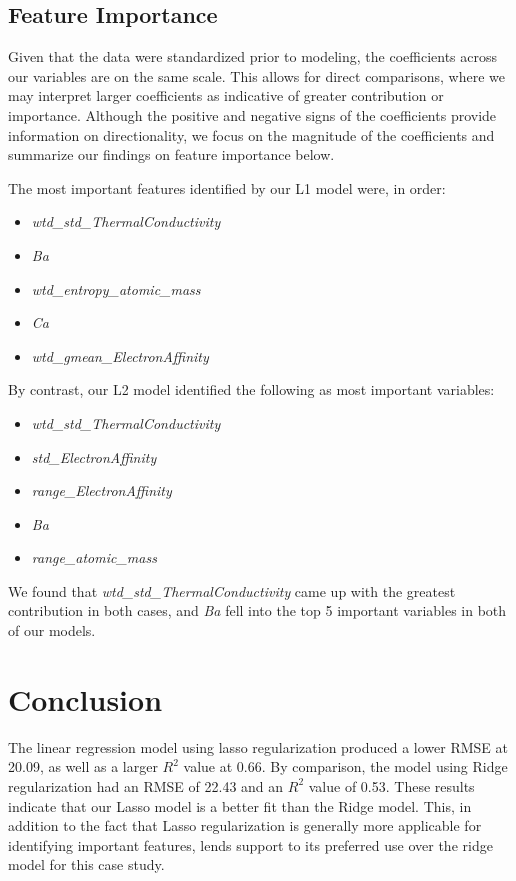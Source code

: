 \documentclass[twoside,twocolumn]{article}
\begin{document}
\subsection{Feature Importance}
Given that the data were standardized prior to modeling, the coefficients across our variables are on the same scale. This allows for direct comparisons, where we may interpret larger coefficients as indicative of greater contribution or importance. Although the positive and negative signs of the coefficients provide information on directionality, we focus on the magnitude of the coefficients and summarize our findings on feature importance below. 

The most important features identified by our L1 model were, in order:
\begin{itemize}
    \item \emph{wtd\_std\_ThermalConductivity}
    \item \emph{Ba}
    \item \emph{wtd\_entropy\_atomic\_mass}
    \item \emph{Ca}
    \item \emph{wtd\_gmean\_ElectronAffinity}
\end{itemize}
By contrast, our L2 model identified the following as most important variables:
\begin{itemize}
    \item \emph{wtd\_std\_ThermalConductivity}
    \item \emph{std\_ElectronAffinity}
    \item \emph{range\_ElectronAffinity}
    \item \emph{Ba}
    \item \emph{range\_atomic\_mass}
\end{itemize}

We found that \emph{wtd\_std\_ThermalConductivity} came up with the greatest contribution in both cases, and \emph{Ba} fell into the top 5 important variables in both of our models. 


\section{Conclusion}

The linear regression model using lasso regularization produced a lower RMSE at 20.09, as well as a larger $R^{2}$ value at 0.66. By comparison, the model using Ridge regularization had an RMSE of 22.43 and an $R^{2}$ value of 0.53. These results indicate that our Lasso model is a better fit than the Ridge model. This, in addition to the fact that Lasso regularization is generally more applicable for identifying important features, lends support to its preferred use over the ridge model for this case study. 
\end{document}
